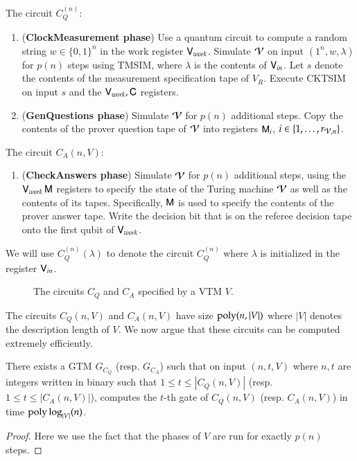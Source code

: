 \begin{center}
\begin{mdframed}
	The circuit $C_Q^{(n)}$:
	  \begin{enumerate}
        \item (\textbf{ClockMeasurement phase}) Use a quantum circuit to compute a random string $w \in \{0,1\}^n$ in the work register ${\mathsf{V}}_{work}$. 
Simulate $\mathcal V$ on input $(1^n,w,\lambda)$ for $p(n)$ steps using TMSIM, where $\lambda$ is the contents of ${\mathsf{V}}_{in}$. Let $s$ denote the contents of the measurement specification tape of $V_R$.   Execute CKTSIM on input $s$ and the ${\mathsf{V}}_{work}, {\mathsf{C}}$ registers.%
        \item (\textbf{GenQuestions phase}) Simulate $\mathcal V$ for $p(n)$ additional steps. Copy the contents of the prover question tape of $\mathcal V$ into registers ${\mathsf{M}}_{i}$, $i\in\{1,\ldots,r_{\mathcal V,n}\}$.
    \end{enumerate}
    
    \medskip
	The circuit $C_A(n,V)$:
	  \begin{enumerate}    
        \item (\textbf{CheckAnswers phase}) Simulate $\mathcal V$ for $p(n)$ additional steps, using the ${\mathsf{V}}_{work} \, {\mathsf{M}}$ registers to specify the state of the Turing machine $\mathcal V$ as well as the contents of its tapes. Specifically, ${\mathsf{M}}$ is used to specify the contents of the prover answer tape. Write the decision bit that is on the referee decision tape onto the first qubit of ${\mathsf{V}}_{work}$.
        \end{enumerate}    
        
        \medskip
       	We will use $C_Q^{(n)}(\lambda)$ to denote the circuit $C_Q^{(n)}$ where $\lambda$ is initialized in the register ${\mathsf{V}}_{in}$.
\end{mdframed}
\begin{figure}[H]
\caption{The circuits $C_Q$ and $C_A$ specified by a VTM $V$.}
\label{fig:vtm_circuits}
\end{figure}
\end{center}

The circuits $C_Q(n,V)$ and $C_A(n,V)$ have size $\operatorname{poly}(n,|V|)$ where $|V|$ denotes the description length of $V$. We now argue that these circuits can be computed extremely efficiently. 
\begin{lemma}
\label{lem:succinct_vtm_circuits}
	There exists a GTM $G_{C_Q}$ (resp. $G_{C_A}$) such that on input $(n,t,V)$ where $n,t$ are integers written in binary such that $1 \leq t \leq |C_Q(n,V)|$ (resp. $1 \leq t \leq |C_A(n,V)|$), computes the $t$-th gate of $C_Q(n,V)$ (resp. $C_A(n,V)$) in time $\operatorname{poly} \log_{|V|} (n)$.
\end{lemma}
\begin{proof}
Here we use the fact that the phases of $V$ are run for exactly $p(n)$ steps.
\end{proof}



